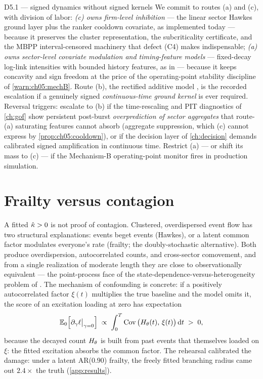 \begin{decision}{D5.1 --- signed dynamics without signed kernels}
We commit to routes (a) and (c), with division of labor: \emph{(c) owns
firm-level inhibition} --- the linear sector Hawkes ground layer plus the
ranker cooldown covariate, as implemented today --- because it preserves
the cluster representation, the subcriticality certificate, and the MBPP
interval-censored machinery that defect (C4) makes indispensable;
\emph{(a) owns sector-level covariate modulation and timing-feature
models} --- fixed-decay log-link intensities with bounded history
features, as in  --- because it
keeps concavity and sign freedom at the price of the operating-point
stability discipline of \cref{warn:ch05:mechB}. Route (b), the rectified
additive model \citep{bonnet2021,costa2020}, is the recorded escalation
if a genuinely signed \emph{continuous-time ground kernel} is ever
required. Reversal triggers: escalate to (b) if the time-rescaling and
PIT diagnostics of \cref{ch:gof} show persistent post-burst
\emph{overprediction of sector aggregates} that route-(a) saturating
features cannot absorb (aggregate suppression, which (c) cannot express
by \cref{prop:ch05:cooldown}), or if the decision layer of
\cref{ch:decision} demands calibrated signed amplification in continuous
time. Restrict (a) --- or shift its mass to (c) --- if the Mechanism-B
operating-point monitor fires in production simulation.
\end{decision}

\section{Frailty versus contagion}\label{ch05:sec:frailty}

A fitted $\hat{\kappa} > 0$ is not proof of contagion. Clustered,
overdispersed event flow has two structural explanations: events beget
events (Hawkes), or a latent common factor modulates everyone's rate
(frailty; the doubly-stochastic alternative). Both produce
overdispersion, autocorrelated counts, and cross-sector comovement, and
from a single realization of moderate length they are close to
observationally equivalent --- the point-process face of the
state-dependence-versus-heterogeneity problem of
\citet{heckmanborjas1980}. The mechanism of confounding is concrete: if a
positively autocorrelated factor $\xi(t)$ multiplies the true baseline
and the model omits it, the score of an excitation loading at zero has
expectation
\begin{equation}\label{eq:ch05:frailtyscore}
\mathbb{E}_0\!\left[\partial_{\gamma}\ell \big|_{\gamma=0}\right]
\;\propto\;
\int_0^{T} \operatorname{Cov}\big(H_{\theta}(t),\, \xi(t)\big) \,\mathrm{d} t \;>\; 0,
\end{equation}
because the decayed count $H_\theta$ is built from past events that
themselves loaded on $\xi$: the fitted excitation absorbs the common
factor. The rehearsal calibrated the damage: under a latent AR($0.90$)
frailty, the freely fitted branching radius came out $2.4\times$ the
truth (\cref{app:results}).


